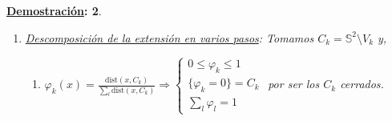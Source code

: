\documentclass[10pt,a4paper,openright]{book}
\theoremstyle{break}
\newtheorem*{demo}{\underline{Demostración}:}
\begin{document}
\begin{demo}
\begin{enumerate}
    \underline{Objetivo}: construir la elevación $\tilde{H}$ en pasos sucesivos: 
    \begin{itemize}
        \item dada $\tilde{H}_t$ para $0 \le t \le t_{i-1}$ extenderla a $t_{i - 1} \le t \le t_i$, es decir, 
        \item dada $\tilde{H}_{t_{i - 1}}$ extenderla a $t_{i - 1} \le t \le t_i$.
    \end{itemize}
    Para empezar en $i = 1$: 
    \[
    \tilde{H}_{t_0} \left( x \right) = \tilde{H}_0\left( x \right) = \left( H_0\left( x \right), u_0\left( x \right) \right) = \left( x_0, u_0 \right),\ \text{cualquier } \overbrace{u_0}^{\neq 0} \perp x_0
    \]
    El paso inductivo da más trabajo y para simplificar un escalamiento permite suponer $\left[ t_{i - 1}, t_i \right]\\ = \left[ 0, 1 \right]$ y $H\left( W_k \times \left[ 0, 1 \right] \right) \subset U$ ó $-U\ \forall k$(*). Queremos:
    \begin{itemize}
        \item dada $\tilde{H}_0$ extenderla a $0 \le t \le 1$
        \begin{demo}
            $\tilde{H}_0 = \tilde{H}_{t_i - 1}$ \underline{no} es la elevación de $i = 1$. 
        \end{demo}
    \end{itemize}

    \item \underline{Descomposición de la extensión en varios pasos}: Tomamos $C_k = \mathbb{S}^{2} \setminus V_k$ y,
    \begin{enumerate}
        \item $\varphi_k\left( x \right) = \frac{\mathrm{dist} \left( x, C_k \right)}{\sum_{l} \mathrm{dist} \left( x, C_k \right)} \Rightarrow \begin{cases}
            0 \le \varphi_k \le 1\\
            \{\varphi_k = 0\} = C_k\\
            \sum_{l} \varphi_l = 1 
        \end{cases}$ por ser los $C_k$ cerrados.


\end{enumerate}
\end{enumerate}
\end{demo}
\end{document}

